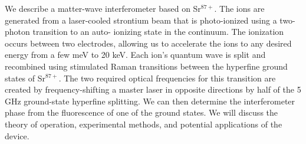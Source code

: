 \documentclass{article}
\begin{document}
We describe a matter-wave interferometer based on Sr$^{87+}$. The ions are generated from a laser-cooled strontium beam that is photo-ionized using a two-photon transition to an auto- ionizing state in the continuum. The ionization occurs between two electrodes, allowing us to accelerate the ions to any desired energy from a few meV to 20 keV. Each ion's quantum wave is split and recombined using stimulated Raman transitions between the hyperfine ground states of Sr$^{87+}$. The two required optical frequencies for this transition are created by frequency-shifting a master laser in opposite directions by half of the 5 GHz ground-state hyperfine splitting. We can then determine the interferometer phase from the fluorescence of one of the ground states. We will discuss the theory of operation, experimental methods, and potential applications of the device.
\end{document}
